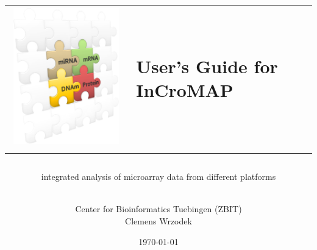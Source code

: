 \documentclass[
  BCOR12mm,
  letterpaper,
  11pt,
  headsepline,
  pointlessnumbers,
  tablecaptionabove,
  onelinecaption,
  headinclude,
  appendixprefix,
  idxtotoc,
  bibtotoc,
  twoside,
  titlepage
]{scrreprt}
\title{
\vspace{1cm}
\centering
\begin{tabular}{C{5cm}C{5cm}}
\includegraphics[width=0.35\columnwidth]{figures/puzzle_logo.png} & \Large{User's Guide for} \Huge{InCroMAP} \\
\end{tabular}
}
\subtitle{integrated analysis of microarray data from different platforms}
\author{\vspace{0.8cm} \\ 
Center for Bioinformatics Tuebingen (ZBIT) \\
Clemens Wrzodek
}
\date{\vspace{2cm}\small{\today}}
\begin{document}

\maketitle
\begin{abstract}

\end{abstract}

\setcounter{tocdepth}{1}
\tableofcontents		%

\cleardoublepage		%











\end{document}
